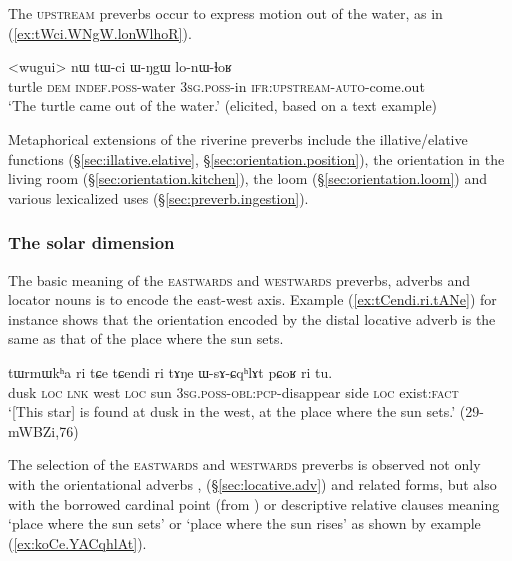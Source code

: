 The \textsc{upstream} preverbs occur to express motion out of the water, as in (\ref{ex:tWci.WNgW.lonWlhoR}).

\begin{exe}
\ex \label{ex:tWci.WNgW.lonWlhoR}
\gll <wugui> nɯ tɯ-ci ɯ-ŋgɯ lo-nɯ-ɬoʁ  \\
turtle \textsc{dem} \textsc{indef}.\textsc{poss}-water \textsc{3sg}.\textsc{poss}-in \textsc{ifr}:\textsc{upstream}-\textsc{auto}-come.out \\
\glt `The turtle came out of the water.' (elicited, based on a text example)
\end{exe}

Metaphorical extensions of the riverine preverbs include the illative/elative functions (§\ref{sec:illative.elative}, §\ref{sec:orientation.position}), the orientation in the living room (§\ref{sec:orientation.kitchen}), the loom (§\ref{sec:orientation.loom}) and various lexicalized uses (§\ref{sec:preverb.ingestion}).

\subsubsection{The solar dimension} \label{sec:solar.dimension} 
The basic meaning of the \textsc{eastwards} and \textsc{westwards} preverbs, adverbs and locator nouns is to encode the east-west axis. Example (\ref{ex:tCendi.ri.tANe}) for instance shows that the orientation encoded by the distal locative adverb  is the same as that of the place where the sun sets.

\begin{exe}
\ex \label{ex:tCendi.ri.tANe}
\gll  tɯrmɯkʰa ri tɕe tɕendi ri tɤŋe ɯ-sɤ-ɕqʰlɤt pɕoʁ ri tu. \\
dusk \textsc{loc} \textsc{lnk} west \textsc{loc} sun \textsc{3sg}.\textsc{poss}-\textsc{obl}:\textsc{pcp}-disappear side \textsc{loc} exist:\textsc{fact} \\
\glt `[This star] is found at dusk in the west, at the place where the sun sets.' (29-mWBZi,76)
\end{exe}

 The selection of the \textsc{eastwards} and \textsc{westwards} preverbs is observed not only with the orientational adverbs ,  (§\ref{sec:locative.adv}) and related forms, but also with the borrowed cardinal point  (from ) or  descriptive relative clauses meaning `place where the sun sets' or `place where the sun rises' as shown by example (\ref{ex:koCe.YACqhlAt}). 

